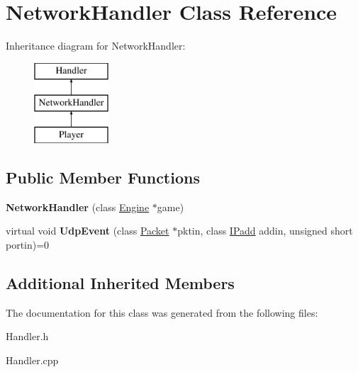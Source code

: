 \hypertarget{class_network_handler}{}\section{Network\+Handler Class Reference}
\label{class_network_handler}
Inheritance diagram for Network\+Handler\+:\begin{figure}[H]
\begin{center}
\leavevmode
\includegraphics[height=3.000000cm]{class_network_handler}
\end{center}
\end{figure}
\subsection*{Public Member Functions}
\begin{DoxyCompactItemize}
\item 
\hypertarget{class_network_handler_a692fd2010a3dd2bf40cd3aac311b9d53}{}\label{class_network_handler_a692fd2010a3dd2bf40cd3aac311b9d53} 
{\bfseries Network\+Handler} (class \hyperlink{class_engine}{Engine} $\ast$game)
\item 
\hypertarget{class_network_handler_a31dab0982a0da9b6ff4d2a964cd804db}{}\label{class_network_handler_a31dab0982a0da9b6ff4d2a964cd804db} 
virtual void {\bfseries Udp\+Event} (class \hyperlink{class_packet}{Packet} $\ast$pktin, class \hyperlink{class_i_padd}{I\+Padd} addin, unsigned short portin)=0
\end{DoxyCompactItemize}
\subsection*{Additional Inherited Members}


The documentation for this class was generated from the following files\+:\begin{DoxyCompactItemize}
\item 
Handler.\+h\item 
Handler.\+cpp\end{DoxyCompactItemize}

